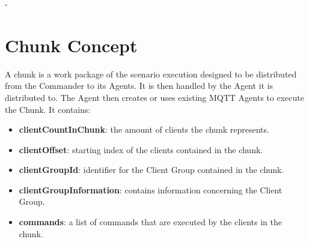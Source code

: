 -\section{Chunk Concept}
A chunk is a work package of the scenario execution designed to be distributed from the Commander to its Agents.
It is then handled by the Agent it is distributed to.
The Agent then creates or uses existing MQTT Agents to execute the Chunk.
It contains:
\begin{itemize}
	\item \textbf{clientCountInChunk}: the amount of clients the chunk represents.
	\item \textbf{clientOffset}: starting index of the clients contained in the chunk.
	\item \textbf{clientGroupId}: identifier for the Client Group contained in the chunk.
	\item \textbf{clientGroupInformation}: contains information concerning the Client Group.
	\item \textbf{commands}: a list of commands that are executed by the clients in the chunk.
\end{itemize}

